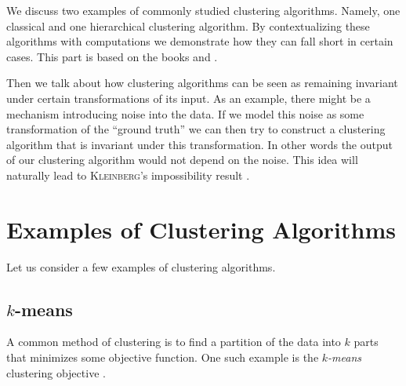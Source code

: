 
    



We discuss two examples of commonly studied clustering algorithms. Namely, one classical and one hierarchical clustering algorithm. By contextualizing these algorithms with computations we demonstrate how they can fall short in certain cases.
This part is based on the books \cite{Everitt2011} and \cite{Scitovski2021}.

Then we talk about how clustering algorithms can be seen as remaining invariant under certain transformations of its input.
As an example, there might be a mechanism introducing noise into the data. If we model this noise as some transformation of the ``ground truth'' we can then try to construct a clustering algorithm that is invariant under this transformation. In other words the output of our clustering algorithm would not depend on the noise. This idea will naturally lead to \textsc{Kleinberg}'s impossibility result \cite{Kleinberg2002}.

\section{Examples of Clustering Algorithms}
Let us consider a few examples of clustering algorithms.

\subsection{$k$-means}
A common method of clustering is to find a partition of the data into $k$ parts that minimizes some objective function.
One such example is the \emph{$k$-means} clustering objective \cite[Sec.~3.1]{Scitovski2021}.


